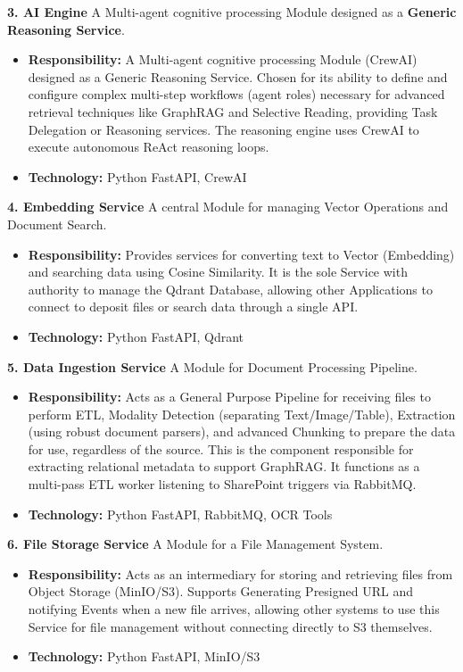 \documentclass[12pt]{article}
\begin{document}
\textbf{3. AI Engine}
A Multi-agent cognitive processing Module designed as a \textbf{Generic Reasoning Service}.
\begin{itemize}
    \item \textbf{Responsibility:} A Multi-agent cognitive processing Module (CrewAI) designed as a Generic Reasoning Service. Chosen for its ability to define and configure complex multi-step workflows (agent roles) necessary for advanced retrieval techniques like GraphRAG and Selective Reading, providing Task Delegation or Reasoning services. The reasoning engine uses CrewAI to execute autonomous ReAct reasoning loops.
    \item \textbf{Technology:} Python FastAPI, CrewAI
\end{itemize}

\textbf{4. Embedding Service}
A central Module for managing Vector Operations and Document Search.
\begin{itemize}
    \item \textbf{Responsibility:} Provides services for converting text to Vector (Embedding) and searching data using Cosine Similarity. It is the sole Service with authority to manage the Qdrant Database, allowing other Applications to connect to deposit files or search data through a single API.
    \item \textbf{Technology:} Python FastAPI, Qdrant
\end{itemize}

\textbf{5. Data Ingestion Service}
A Module for Document Processing Pipeline.
\begin{itemize}
    \item \textbf{Responsibility:} Acts as a General Purpose Pipeline for receiving files to perform ETL, Modality Detection (separating Text/Image/Table), Extraction (using robust document parsers), and advanced Chunking to prepare the data for use, regardless of the source. This is the component responsible for extracting relational metadata to support GraphRAG. It functions as a multi-pass ETL worker listening to SharePoint triggers via RabbitMQ.
    \item \textbf{Technology:} Python FastAPI, RabbitMQ, OCR Tools
\end{itemize}

\textbf{6. File Storage Service}
A Module for a File Management System.
\begin{itemize}
    \item \textbf{Responsibility:} Acts as an intermediary for storing and retrieving files from Object Storage (MinIO/S3). Supports Generating Presigned URL and notifying Events when a new file arrives, allowing other systems to use this Service for file management without connecting directly to S3 themselves.
    \item \textbf{Technology:} Python FastAPI, MinIO/S3
\end{itemize}
\end{document}
